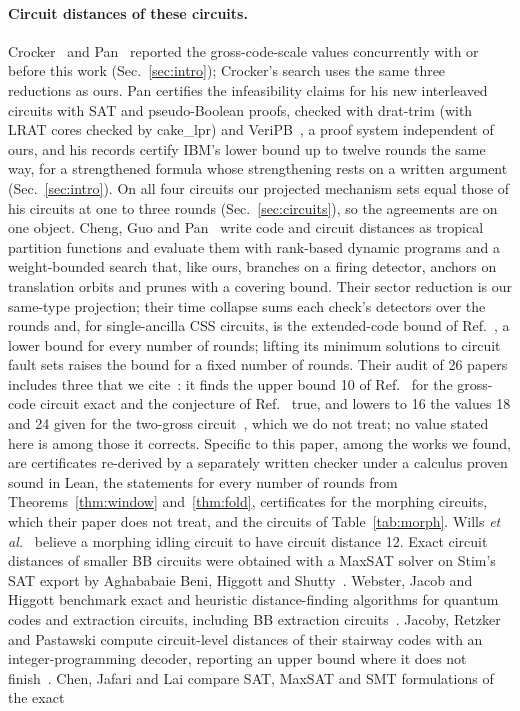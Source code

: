 \documentclass[aps,pra,twocolumn,superscriptaddress,nofootinbib,longbibliography,floatfix]{revtex4-2}
\begin{document}
\paragraph*{Circuit distances of these circuits.} Crocker~\cite{crocker2026gross} and Pan~\cite{pan2026interleaving,pan2026e017,pan2026e019,pan2026e037,pan2026e043,pan2026e045} reported the gross-code-scale values concurrently with or before this work (Sec.~\ref{sec:intro}); Crocker's search uses the same three reductions as ours. Pan certifies the infeasibility claims for his new interleaved circuits with SAT and pseudo-Boolean proofs, checked with drat-trim (with LRAT cores checked by cake\_lpr) and VeriPB~\cite{wetzler2014drattrim,tan2023cakelpr,gocht2021veripb}, a proof system independent of ours, and his records certify IBM's lower bound up to twelve rounds the same way, for a strengthened formula whose strengthening rests on a written argument (Sec.~\ref{sec:intro}). On all four circuits our projected mechanism sets equal those of his circuits at one to three rounds (Sec.~\ref{sec:circuits}), so the agreements are on one object. Cheng, Guo and Pan~\cite{cheng2026certifying} write code and circuit distances as tropical partition functions and evaluate them with rank-based dynamic programs and a weight-bounded search that, like ours, branches on a firing detector, anchors on translation orbits and prunes with a covering bound. Their sector reduction is our same-type projection; their time collapse sums each check's detectors over the rounds and, for single-ancilla CSS circuits, is the extended-code bound of Ref.~\cite{strikis2026high}, a lower bound for every number of rounds; lifting its minimum solutions to circuit fault sets raises the bound for a fixed number of rounds. Their audit of 26 papers includes three that we cite~\cite{bravyi2024high,strikis2026high,webster2026distance}: it finds the upper bound 10 of Ref.~\cite{bravyi2024high} for the gross-code circuit exact and the conjecture of Ref.~\cite{strikis2026high} true, and lowers to 16 the values 18 and 24 given for the two-gross circuit~\cite{bravyi2024high,webster2026distance}, which we do not treat; no value stated here is among those it corrects. Specific to this paper, among the works we found, are certificates re-derived by a separately written checker under a calculus proven sound in Lean, the statements for every number of rounds from Theorems~\ref{thm:window} and~\ref{thm:fold}, certificates for the morphing circuits, which their paper does not treat, and the circuits of Table~\ref{tab:morph}. Wills \textit{et al.}~\cite{wills2026concatenating} believe a morphing idling circuit to have circuit distance 12. Exact circuit distances of smaller BB circuits were obtained with a MaxSAT solver on Stim's SAT export by Aghababaie Beni, Higgott and Shutty~\cite{beni2025tesseract}. Webster, Jacob and Higgott benchmark exact and heuristic distance-finding algorithms for quantum codes and extraction circuits, including BB extraction circuits~\cite{webster2026distance}. Jacoby, Retzker and Pastawski compute circuit-level distances of their stairway codes with an integer-programming decoder, reporting an upper bound where it does not finish~\cite{jacoby2026stairway}. Chen, Jafari and Lai compare SAT, MaxSAT and SMT formulations of the exact 
\end{document}

